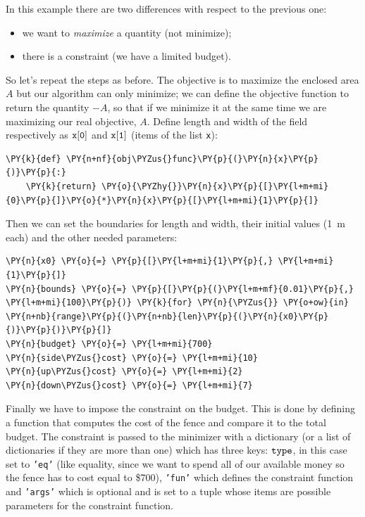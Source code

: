 In this example there are two differences with respect to the previous one:

\begin{itemize}
\tightlist
\item
  we want to \emph{maximize} a quantity (not minimize);
\item
  there is a constraint (we have a limited budget).
\end{itemize}

So let's repeat the steps as before. The objective is to maximize the
enclosed area \(A\) but our algorithm can only minimize; we can define the objective function 
to return the quantity \(-A\), so that if we minimize it at the same time 
we are maximizing our real objective, $A$. 
Define length and width of the field respectively as \(\tt{x[0]}\) and
\(\tt{x[1]}\) (items of the list \texttt{x}):

\begin{codebox}
\begin{Verbatim}[commandchars=\\\{\}]
\PY{k}{def} \PY{n+nf}{obj\PYZus{}func}\PY{p}{(}\PY{n}{x}\PY{p}{)}\PY{p}{:}
    \PY{k}{return} \PY{o}{\PYZhy{}}\PY{n}{x}\PY{p}{[}\PY{l+m+mi}{0}\PY{p}{]}\PY{o}{*}\PY{n}{x}\PY{p}{[}\PY{l+m+mi}{1}\PY{p}{]}
\end{Verbatim}
\end{codebox}
Then we can set the boundaries for length and width, their initial values (1~m each) and the other needed parameters:

\begin{codebox}
\begin{Verbatim}[commandchars=\\\{\}]
\PY{n}{x0} \PY{o}{=} \PY{p}{[}\PY{l+m+mi}{1}\PY{p}{,} \PY{l+m+mi}{1}\PY{p}{]}
\PY{n}{bounds} \PY{o}{=} \PY{p}{[}\PY{p}{(}\PY{l+m+mf}{0.01}\PY{p}{,} \PY{l+m+mi}{100}\PY{p}{)} \PY{k}{for} \PY{n}{\PYZus{}} \PY{o+ow}{in} \PY{n+nb}{range}\PY{p}{(}\PY{n+nb}{len}\PY{p}{(}\PY{n}{x0}\PY{p}{)}\PY{p}{)}\PY{p}{]}
\PY{n}{budget} \PY{o}{=} \PY{l+m+mi}{700}
\PY{n}{side\PYZus{}cost} \PY{o}{=} \PY{l+m+mi}{10}
\PY{n}{up\PYZus{}cost} \PY{o}{=} \PY{l+m+mi}{2}
\PY{n}{down\PYZus{}cost} \PY{o}{=} \PY{l+m+mi}{7}
\end{Verbatim}
\end{codebox}

Finally we have to impose the constraint on the budget. This is done by
defining a function that computes the cost of the fence and
compare it to the total budget. 
The constraint is passed to the minimizer with a dictionary (or a list 
of dictionaries if they are more than one) which has three keys: 
\(\tt{type}\), in this case set to \texttt{'eq'}
(like equality, since we want to spend all of our available money so the
fence has to cost equal to \$700), \texttt{'fun'} which defines the constraint 
function and \texttt{'args'} which is optional and is set to a tuple 
whose items are possible parameters for the constraint function.

